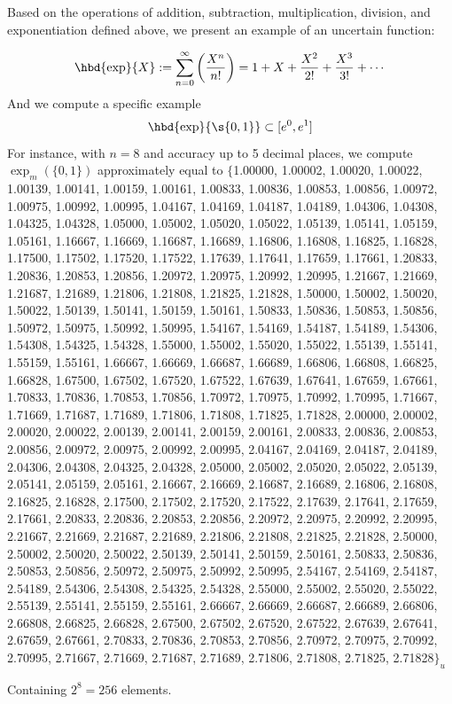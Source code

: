 \begin{example}
	Based on the operations of addition, subtraction, multiplication, division, and exponentiation defined above, we present an example of an uncertain function:

	$$\hbd{\exp}{X} := \sum_{n=0}^{\infty} \left(\frac{X^n}{n!}\right) = 1 + X + \frac{X^2}{2!} + \frac{X^3}{3!} + \cdots
	$$
	And we compute a specific example $$\hbd{\exp}{\s{0,1}} \subset [e^0,e^1]$$
	For instance, with $n=8$ and accuracy up to 5 decimal places, we compute $\exp_m\left(\{0,1\}\right)$ approximately equal to
	$\{$1.00000, 1.00002, 1.00020, 1.00022, 1.00139, 1.00141, 1.00159, 1.00161, 1.00833, 1.00836, 1.00853, 1.00856, 1.00972, 1.00975, 1.00992, 1.00995, 1.04167, 1.04169, 1.04187, 1.04189, 1.04306, 1.04308, 1.04325, 1.04328, 1.05000, 1.05002, 1.05020, 1.05022, 1.05139, 1.05141, 1.05159, 1.05161, 1.16667, 1.16669, 1.16687, 1.16689, 1.16806, 1.16808, 1.16825, 1.16828, 1.17500, 1.17502, 1.17520, 1.17522, 1.17639, 1.17641, 1.17659, 1.17661, 1.20833, 1.20836, 1.20853, 1.20856, 1.20972, 1.20975, 1.20992, 1.20995, 1.21667, 1.21669, 1.21687, 1.21689, 1.21806, 1.21808, 1.21825, 1.21828, 1.50000, 1.50002, 1.50020, 1.50022, 1.50139, 1.50141, 1.50159, 1.50161, 1.50833, 1.50836, 1.50853, 1.50856, 1.50972, 1.50975, 1.50992, 1.50995, 1.54167, 1.54169, 1.54187, 1.54189, 1.54306, 1.54308, 1.54325, 1.54328, 1.55000, 1.55002, 1.55020, 1.55022, 1.55139, 1.55141, 1.55159, 1.55161, 1.66667, 1.66669, 1.66687, 1.66689, 1.66806, 1.66808, 1.66825, 1.66828, 1.67500, 1.67502, 1.67520, 1.67522, 1.67639, 1.67641, 1.67659, 1.67661, 1.70833, 1.70836, 1.70853, 1.70856, 1.70972, 1.70975, 1.70992, 1.70995, 1.71667, 1.71669, 1.71687, 1.71689, 1.71806, 1.71808, 1.71825, 1.71828, 2.00000, 2.00002, 2.00020, 2.00022, 2.00139, 2.00141, 2.00159, 2.00161, 2.00833, 2.00836, 2.00853, 2.00856, 2.00972, 2.00975, 2.00992, 2.00995, 2.04167, 2.04169, 2.04187, 2.04189, 2.04306, 2.04308, 2.04325, 2.04328, 2.05000, 2.05002, 2.05020, 2.05022, 2.05139, 2.05141, 2.05159, 2.05161, 2.16667, 2.16669, 2.16687, 2.16689, 2.16806, 2.16808, 2.16825, 2.16828, 2.17500, 2.17502, 2.17520, 2.17522, 2.17639, 2.17641, 2.17659, 2.17661, 2.20833, 2.20836, 2.20853, 2.20856, 2.20972, 2.20975, 2.20992, 2.20995, 2.21667, 2.21669, 2.21687, 2.21689, 2.21806, 2.21808, 2.21825, 2.21828, 2.50000, 2.50002, 2.50020, 2.50022, 2.50139, 2.50141, 2.50159, 2.50161, 2.50833, 2.50836, 2.50853, 2.50856, 2.50972, 2.50975, 2.50992, 2.50995, 2.54167, 2.54169, 2.54187, 2.54189, 2.54306, 2.54308, 2.54325, 2.54328, 2.55000, 2.55002, 2.55020, 2.55022, 2.55139, 2.55141, 2.55159, 2.55161, 2.66667, 2.66669, 2.66687, 2.66689, 2.66806, 2.66808, 2.66825, 2.66828, 2.67500, 2.67502, 2.67520, 2.67522, 2.67639, 2.67641, 2.67659, 2.67661, 2.70833, 2.70836, 2.70853, 2.70856, 2.70972, 2.70975, 2.70992, 2.70995, 2.71667, 2.71669, 2.71687, 2.71689, 2.71806, 2.71808, 2.71825, 2.71828$\}_u$

	\noindent Containing $2^8 = 256$ elements.
\end{example}
